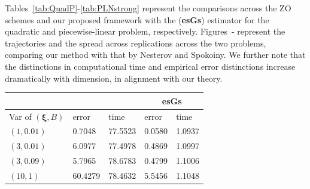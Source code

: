 \documentclass[11pt,reqno]{amsart}
\newcommand{\1}{{\bf 1}}
\newcommand{\2}{{\bf 2}}
\newcommand{\bxi}{\boldsymbol{\xi}}
\numberwithin{equation}{section}
\theoremstyle{remark}
\begin{document}
{\begin{figure}
\begin{minipage}{0.51\textwidth}
					\end{minipage}
				\end{figure}
				Tables~\ref{tab:QuadP}-\ref{tab:PLNstrong} represent the comparisons across the ZO schemes and our proposed framework with the ({\bf esGs}) estimator for the quadratic and piecewise-linear problem, respectively. Figures~- represent the trajectories and the spread across replications across the two problems, comparing our method with that by Nesterov and Spokoiny.
				 We further note that the distinctions in computational time and empirical error distinctions increase
				dramatically with dimension, in alignment with our theory.
				\begin{table}[H]
					\parbox{.54\linewidth}{
						\captionsetup{width=\textwidth}
						\tiny
						\label{tab:QuadPvar}
						\begin{tabular}{ |p{1.8cm} |p{1.1cm}|p{1.1cm}|p{1cm}|p{1cm}|}
							\hline
							&  \multicolumn{2}{|C{2.5cm}|}{\citet{nesterov2017random}} & \multicolumn{2}{|c|}{\bf esGs} \\
							\hline
							Var of $(\bxi,B)$ &error&time&error&time\\
							\hline
							$(1,0.01)$& 0.7048  &  77.5523  & 0.0580 & 1.0937\\
							\hline
							$(3,0.01)$& 6.0977 &  77.4978  & 0.4869 & 1.0997\\
							\hline
							$(3,0.09)$  & 5.7965  &  78.6783  & 0.4799 & 1.1006\\
							\hline
							$(10,1)$ &  60.4279 &  78.4632  & 5.5456 & 1.1048\\
							\hline

\end{tabular}}
\end{table}}
\end{document}
